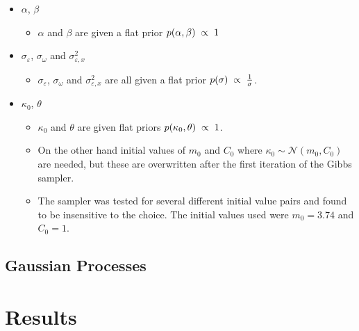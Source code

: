 \documentclass[
]{book}
\providecommand{\tightlist}{%
  \setlength{\itemsep}{0pt}\setlength{\parskip}{0pt}}
\begin{document}
\begin{itemize}
\tightlist
\item
  \(\alpha\), \(\beta\)

  \begin{itemize}
  \tightlist
  \item
    \(\alpha\) and \(\beta\) are given a flat prior \(p(\alpha, \beta) \hspace{1mm} \propto \hspace{1mm} 1\)
  \end{itemize}
\item
  \(\sigma_\varepsilon\), \(\sigma_\omega\) and \(\sigma^2_{\varepsilon, x}\)

  \begin{itemize}
  \tightlist
  \item
    \(\sigma_\varepsilon\), \(\sigma_\omega\) and \(\sigma^2_{\varepsilon, x}\) are all given a flat prior \(p(\sigma) \hspace{1mm} \propto \hspace{1mm} \frac1\sigma\).
  \end{itemize}
\item
  \(\kappa_0\), \(\theta\)

  \begin{itemize}
  \tightlist
  \item
    \(\kappa_0\) and \(\theta\) are given flat priors \(p(\kappa_0, \theta) \hspace{1mm} \propto \hspace{1mm} 1\).
  \item
    On the other hand initial values of \(m_0\) and \(C_0\) where \(\kappa_0 \sim \mathcal N(m_0, C_0)\) are needed, but these are overwritten after the first iteration of the Gibbs sampler.
  \item
    The sampler was tested for several different initial value pairs and found to be insensitive to the choice. The initial values used were \(m_0 = 3.74\) and \(C_0 = 1\).
  \end{itemize}
\end{itemize}

\hypertarget{gaussian-processes-1}{%
\section{Gaussian Processes}\label{gaussian-processes-1}}

\hypertarget{results}{%
\chapter{Results}\label{results}}
\end{document}
